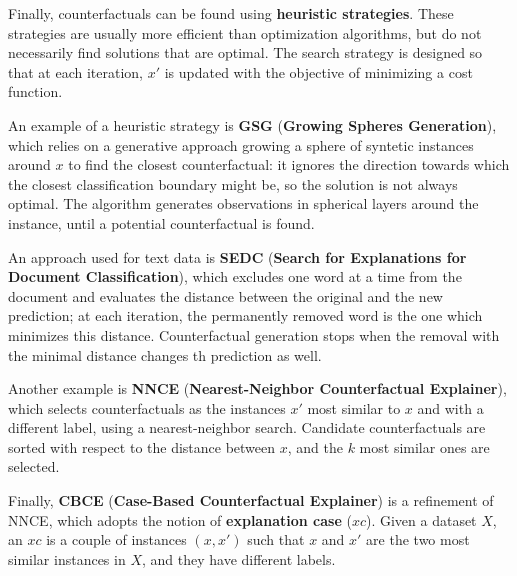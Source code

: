 Finally, counterfactuals can be found using \textbf{heuristic strategies}. These strategies are usually more efficient than optimization algorithms, but do not necessarily find solutions that are optimal. The search strategy is designed so that at each iteration, $x'$ is updated with the objective of minimizing a cost function.

An example of a heuristic strategy is \textbf{GSG} (\textbf{Growing Spheres Generation}), which relies on a generative approach growing a sphere of syntetic instances around $x$ to find the closest counterfactual: it ignores the direction towards which the closest classification boundary might be, so the solution is not always optimal. The algorithm generates observations in spherical layers around the instance, until a potential counterfactual is found.

An approach used for text data is \textbf{SEDC} (\textbf{Search for Explanations for Document Classification}), which excludes one word at a time from the document and evaluates the distance between the original and the new prediction; at each iteration, the permanently removed word is the one which minimizes this distance. Counterfactual generation stops when the removal with the minimal distance changes th prediction as well.

Another example is \textbf{NNCE} (\textbf{Nearest-Neighbor Counterfactual Explainer}), which selects counterfactuals as the instances $x'$ most similar to $x$ and with a different label, using a nearest-neighbor search. Candidate counterfactuals are sorted with respect to the distance between $x$, and the $k$ most similar ones are selected.

Finally, \textbf{CBCE} (\textbf{Case-Based Counterfactual Explainer}) is a refinement of NNCE, which adopts the notion of \textbf{explanation case} ($xc$). Given a dataset $X$, an $xc$ is a couple of instances $(x,x')$ such that $x$ and $x'$ are the two most similar instances in $X$, and they have different labels.